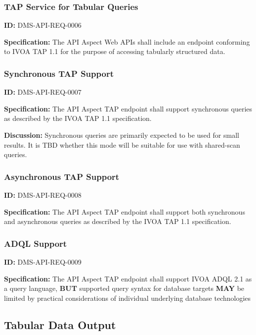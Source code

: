 \documentclass[SE,toc,lsstdraft]{lsstdoc}
\begin{document}
\subsubsection{TAP Service for Tabular Queries}

\label{DMS-API-REQ-0006}
\textbf{ID:} DMS-API-REQ-0006

\textbf{Specification:}
The API Aspect Web APIs shall include an endpoint conforming to IVOA TAP 1.1 for the purpose of accessing tabularly structured data.

\subsubsection{Synchronous TAP Support}

\label{DMS-API-REQ-0007}
\textbf{ID:} DMS-API-REQ-0007

\textbf{Specification:}
The API Aspect TAP endpoint shall support synchronous queries as described by the IVOA TAP 1.1 specification.

\textbf{Discussion:}
Synchronous queries are primarily expected to be used for small results.  It is TBD whether this mode will be suitable for use with shared-scan queries.

\subsubsection{Asynchronous TAP Support}

\label{DMS-API-REQ-0008}
\textbf{ID:} DMS-API-REQ-0008

\textbf{Specification:}
The API Aspect TAP endpoint shall support both synchronous and asynchronous queries as described by the IVOA TAP 1.1 specification.

\subsubsection{ADQL Support}

\label{DMS-API-REQ-0009}
\textbf{ID:} DMS-API-REQ-0009

\textbf{Specification:}
The API Aspect TAP endpoint shall support IVOA ADQL 2.1 as a query language, \textbf{BUT} supported query syntax for database targets \textbf{MAY} be limited by practical considerations of individual underlying database technologies

\subsection{Tabular Data Output}
\end{document}
